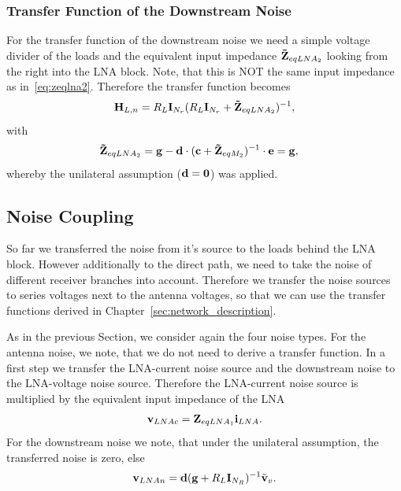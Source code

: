 \subsubsection{Transfer Function of the Downstream Noise}
\label{sec:down_noise_transf}
For the transfer function of the downstream noise we need a simple voltage divider of the loads and the equivalent input impedance $\mathbf{\tilde{Z}}_{eqLNA_2}$ looking from the right into the LNA block.
Note, that this is NOT the same input impedance as in~\eqref{eq:zeqlna2}.
Therefore the transfer function becomes
\begin{equation}
\mathbf{H}_{L,n} = R_L\mathbf{I}_{N_r}(R_L\mathbf{I}_{N_r} + \mathbf{\tilde{Z}}_{eqLNA_2})^{-1},
\end{equation}
with 
\begin{align}
\label{eq:zeqlna2_down}
\mathbf{\tilde{Z}}_{eqLNA_2} &= \mathbf{g} - \mathbf{d}\cdot(\mathbf{c} + \mathbf{\tilde{Z}}_{eqM_2})^{-1}\cdot\mathbf{e} = \mathbf{g},
\end{align}
whereby the unilateral assumption ($\mathbf{d}=\mathbf{0}$) was applied.


\subsection{Noise Coupling}
\label{sec:noise_coupling}

So far we transferred the noise from it's source to the loads behind the LNA block.
However additionally to the direct path, we need to take the noise of different receiver branches into account.
Therefore we transfer the noise sources to series voltages next to the antenna voltages, so that we can use the transfer functions derived in Chapter~\ref{sec:network_description}.

As in the previous Section, we consider again the four noise types.
For the antenna noise, we note, that we do not need to derive a transfer function.
In a first step we transfer the LNA-current noise source and the downstream noise to the LNA-voltage noise source.
Therefore the LNA-current noise source is multiplied by the equivalent input impedance of the LNA
\begin{align}
\mathbf{v}_{LNAc} = \mathbf{Z}_{eqLNA_1} \mathbf{i}_{LNA}.
\end{align}
For the downstream noise we note, that under the unilateral assumption, the transferred noise is zero, else
\begin{align}
\mathbf{v}_{LNAn} = \mathbf{d}(\mathbf{g}+R_L\mathbf{I}_{N_R})^{-1} \tilde{\mathbf{v}}_{v}.
\end{align}

